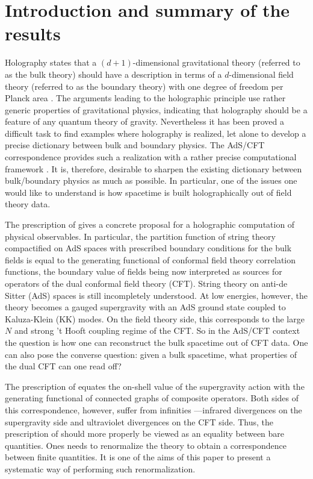 \section{Introduction and summary of the results}
\setcounter{equation}{0}

Holography states that a $(d{+}1)$-dimensional gravitational 
theory (referred to as the bulk theory) should have a 
description in terms of a $d$-dimensional
field theory (referred to as the boundary theory)
with one degree of freedom per Planck area
\cite{tHooft,Susskind}. The arguments leading to the 
holographic principle use rather generic properties
of gravitational physics, indicating that holography
should be a feature of any quantum theory of gravity.
Nevertheless it has been proved a difficult task 
to find examples where holography is realized,
let alone to develop a precise dictionary 
between bulk and boundary physics. The AdS/CFT 
correspondence \cite{Malda} provides such a realization \cite{Wit,SussWit}
with a rather precise computational framework \cite{Gubs,Wit}.
It is, therefore, desirable to sharpen the existing 
dictionary between bulk/boundary physics as much as possible. 
In particular, one of the issues one would like to
understand is how spacetime is built 
holographically out of field theory data.

The prescription of \cite{Gubs,Wit} gives a concrete 
proposal for a holographic computation of physical
observables. In particular, the partition function
of string theory compactified on AdS spaces 
with prescribed boundary conditions for the 
bulk fields is equal to the generating functional 
of conformal field theory correlation 
functions, the boundary value of fields being now 
interpreted as sources for operators of the dual conformal 
field theory (CFT). 
String theory on anti-de Sitter (AdS) spaces is still incompletely
understood. At low energies, however, the theory 
becomes a gauged supergravity with an AdS ground
state coupled to Kaluza-Klein (KK) modes. On the 
field theory side, this corresponds to the large $N$
and strong 't Hooft coupling regime of the 
CFT. So in the AdS/CFT context the question is how
one can reconstruct the bulk spacetime out of
CFT data. One can also pose the converse 
question: given a bulk spacetime, what 
properties of the dual CFT can one read off?


The prescription of \cite{Gubs,Wit} equates the 
on-shell value of the supergravity action 
with the generating functional of connected graphs
of composite operators. Both sides of this 
correspondence, however, suffer from infinities
---infrared divergences on the supergravity side
and ultraviolet divergences on the CFT side.
Thus, the prescription of \cite{Gubs,Wit}
should more properly be viewed as an equality between
bare quantities. Ones needs to renormalize the theory to obtain a 
correspondence between 
finite quantities. It is one of the aims of this 
paper to present a systematic way of performing 
such renormalization.
 
